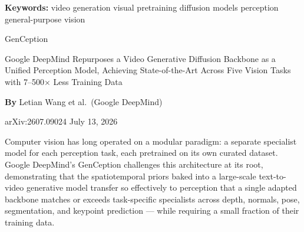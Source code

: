 \documentclass[10pt,twocolumn]{article}
\begin{document}
\setlength{\parindent}{0pt}
\setlength{\parskip}{4pt}

{\small\color{keywordgray}\textbf{Keywords:}
  video generation \textbullet{}
  visual pretraining \textbullet{}
  diffusion models \textbullet{}
  perception \textbullet{}
  general-purpose vision}\par\vspace{4pt}

{\LARGE\bfseries\raggedright
  GenCeption}\par\vspace{4pt}

{\large\itshape\raggedright
  Google DeepMind Repurposes a Video Generative Diffusion Backbone
  as a Unified Perception Model, Achieving State-of-the-Art Across
  Five Vision Tasks with 7--500$\times$ Less Training Data}\par\vspace{6pt}

{\small\textbf{By} Letian Wang et al.\
  (Google DeepMind)}\par\vspace{2pt}

{\small\color{keywordgray}arXiv:2607.09024 \textbullet{}
  July 13, 2026}
\par\vspace{2pt}\noindent{\color{rulered}\rule{\columnwidth}{0.6pt}}\vspace{6pt}

Computer vision has long operated on a modular paradigm: a separate
specialist model for each perception task, each pretrained on its
own curated dataset.
Google DeepMind's GenCeption challenges this architecture at its root,
demonstrating that the spatiotemporal priors baked into a large-scale
text-to-video generative model transfer so effectively to perception
that a single adapted backbone matches or exceeds task-specific
specialists across depth, normals, pose, segmentation, and
keypoint prediction --- while requiring a small fraction of their
training data.
\end{document}
